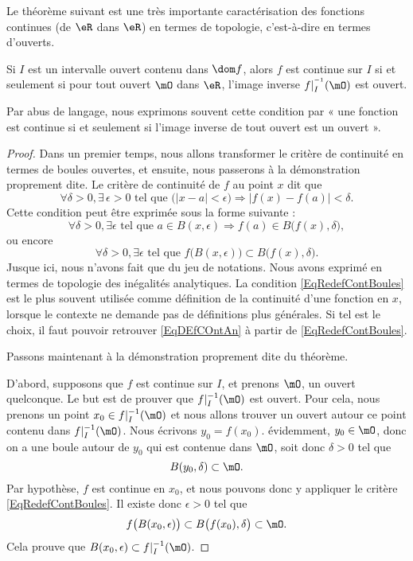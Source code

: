 Le théorème suivant est une très importante caractérisation des fonctions continues (de $\eR$ dans $\eR$) en termes de topologie, c'est-à-dire en termes d'ouverts.

\begin{theorem}     \label{ThoContInvOuvert}
Si $I$ est un intervalle ouvert contenu dans $\dom f$, alors $f$ est continue sur $I$ si et seulement si pour tout ouvert $\mO$ dans $\eR$, l'image inverse $f|_I^{^{-1}}(\mO)$ est ouvert.
\end{theorem}

Par abus de langage, nous exprimons souvent cette condition par « une fonction est continue si et seulement si l'image inverse de tout ouvert est un ouvert ».

\begin{proof}

Dans un premier temps, nous allons transformer le critère de continuité en termes de boules ouvertes, et ensuite, nous passerons à la démonstration proprement dite. Le critère de continuité de $f$ au point $x$ dit que
\begin{equation}        \label{EqDEfCOntAn}
  \forall \delta>0,\exists\,\epsilon>0\text{ tel que }\big( | x-a |< \epsilon \big)\Rightarrow| f(x)-f(a) |<\delta.
\end{equation}
Cette condition peut être exprimée sous la forme suivante :
\[
  \forall \delta>0,\exists\epsilon\text{ tel que } a\in B(x,\epsilon)\Rightarrow f(a)\in B\big( f(x),\delta \big),
\]
ou encore
\begin{equation}        \label{EqRedefContBoules}
  \forall \delta>0,\exists\epsilon\text{ tel que } f\big( B(x,\epsilon) \big)\subset B\big( f(x),\delta \big).
\end{equation}
Jusque ici, nous n'avons fait que du jeu de notations. Nous avons exprimé en termes de topologie des inégalités analytiques. La condition \eqref{EqRedefContBoules} est le plus souvent utilisée comme définition de la continuité d'une fonction en \( x\), lorsque le contexte ne demande pas de définitions plus générales. Si tel est le choix, il faut pouvoir retrouver \eqref{EqDEfCOntAn} à partir de \eqref{EqRedefContBoules}.

Passons maintenant à la démonstration proprement dite du théorème.

D'abord, supposons que $f$ est continue sur $I$, et prenons $\mO$, un ouvert quelconque. Le but est de prouver que $f|_I^{-1}(\mO)$ est ouvert. Pour cela, nous prenons un point $x_0\in f|_I^{-1}(\mO)$ et nous allons trouver un ouvert autour ce point contenu dans $f|_I^{-1}(\mO)$. Nous écrivons $y_0=f(x_0)$. évidemment, $y_0\in\mO$, donc on a une boule autour de $y_0$ qui est contenue dans $\mO$, soit donc $\delta>0$ tel que
\[
  B(y_0,\delta)\subset\mO.
\]
Par hypothèse, $f$ est continue en $x_0$, et nous pouvons donc y appliquer le critère \eqref{EqRedefContBoules}. Il existe donc $\epsilon>0$ tel que
\[
  f\big( B(x_0,\epsilon) \big)\subset B\big( f(x_0),\delta \big)\subset\mO.
\]
Cela prouve que $B(x_0,\epsilon)\subset f|_I^{-1}(\mO)$.


\end{proof}
